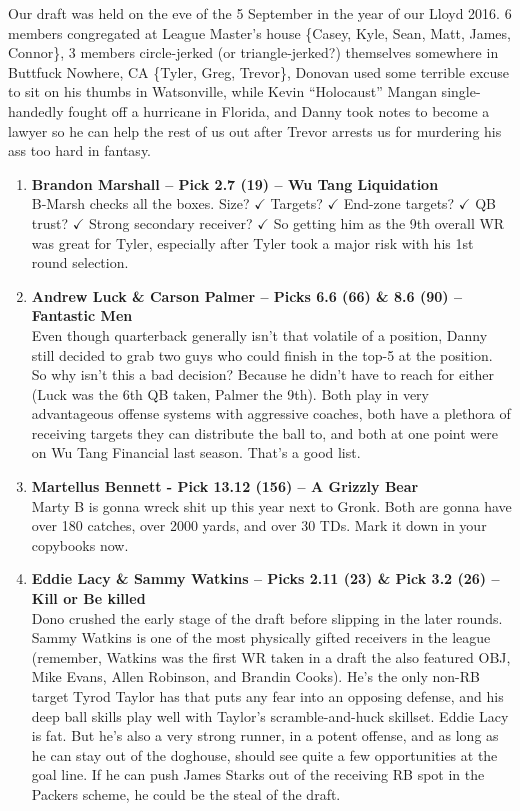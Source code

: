 \documentclass[11pt,letterpaper]{article}
\begin{document}
\newpage
{}

Our draft was held on the eve of the 5 September in the year of our Lloyd 2016. 6 members congregated at League Master's house \{Casey, Kyle, Sean, Matt, James, Connor\}, 3 members circle-jerked (or triangle-jerked?) themselves somewhere in Buttfuck Nowhere, CA \{Tyler, Greg, Trevor\}, Donovan used some terrible excuse to sit on his thumbs in Watsonville, while Kevin ``Holocaust'' Mangan single-handedly fought off a hurricane in Florida, and Danny took notes to become a lawyer so he can help the rest of us out after Trevor arrests us for murdering his ass too hard in fantasy.

\begin{enumerate}
\item \textbf{Brandon Marshall -- Pick 2.7 (19) -- Wu Tang Liquidation}
\\B-Marsh checks all the boxes. Size? $\checkmark$ Targets? $\checkmark$ End-zone targets? $\checkmark$ QB trust? $\checkmark$ Strong secondary receiver? $\checkmark$ So getting him as the 9th overall WR was great for Tyler, especially after Tyler took a major risk with his 1st round selection.

\item \textbf{Andrew Luck \& Carson Palmer -- Picks 6.6 (66) \& 8.6 (90) -- Fantastic Men}
\\Even though quarterback generally isn't that volatile of a position, Danny still decided to grab two guys who could finish in the top-5 at the position. So why isn't this a bad decision? Because he didn't have to reach for either (Luck was the 6th QB taken, Palmer the 9th). Both play in very advantageous offense systems with aggressive coaches, both have a plethora of receiving targets they can distribute the ball to, and both at one point were on Wu Tang Financial last season. That's a good list.

\item \textbf{Martellus Bennett - Pick 13.12 (156) -- A Grizzly Bear}
\\Marty B is gonna wreck shit up this year next to Gronk. Both are gonna have over 180 catches, over 2000 yards, and over 30 TDs. Mark it down in your copybooks now.

\item \textbf{Eddie Lacy \& Sammy Watkins -- Picks 2.11 (23) \& Pick 3.2 (26) -- Kill or Be killed}
\\Dono crushed the early stage of the draft before slipping in the later rounds. Sammy Watkins is one of the most physically gifted receivers in the league (remember, Watkins was the first WR taken in a draft the also featured OBJ, Mike Evans, Allen Robinson, and Brandin Cooks). He's the only non-RB target Tyrod Taylor has that puts any fear into an opposing defense, and his deep ball skills play well with Taylor's scramble-and-huck skillset. Eddie Lacy is fat. But he's also a very strong runner, in a potent offense, and as long as he can stay out of the doghouse, should see quite a few opportunities at the goal line. If he can push James Starks out of the receiving RB spot in the Packers scheme, he could be the steal of the draft.
 

\end{enumerate}
\end{document}
